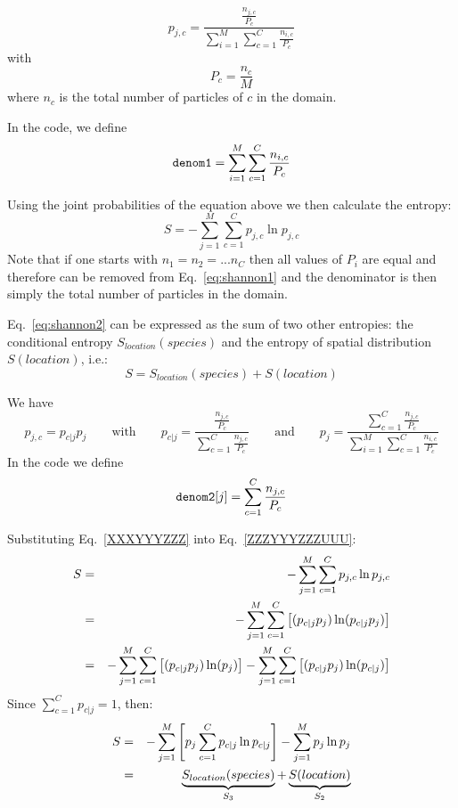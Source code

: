 \begin{equation}
p_{j,c} = \frac{\frac{n_{j,c}}{P_c}}{\sum\limits_{i=1}^M \sum\limits_{c=1}^C \frac{n_{i,c}}{P_c}}
\label{eq:shannon1}
\end{equation}
with 
\[
P_c = \frac{n_c}{M}
\]
where $n_c$ is the total number of particles of $c$ in the domain.

In the code, we define
\[
{\tt denom1}=\sum\limits_{i=1}^M \sum\limits_{c=1}^C \frac{n_{i,c}}{P_c}
\]

Using the joint probabilities of the equation above we then calculate the entropy:
\begin{equation}
S= -\sum_{j=1}^M \sum_{c=1}^C p_{j,c} \ln p_{j,c}
\label{eq:shannon2}
\end{equation}
Note that if one starts with $n_1=n_2=...n_C$ then all values of $P_i$ are equal and 
therefore can be removed from Eq.~\eqref{eq:shannon1} and the denominator is then simply 
the total number of particles in the domain.

Eq.~\eqref{eq:shannon2} can be expressed as the sum of two other entropies:
the conditional entropy $S_{location}(species)$ and the entropy of spatial 
distribution $S(location)$, i.e.:
\[
S=S_{location}(species) + S(location)
\]

We have 
\[
p_{j,c} = p_{c|j}p_j
\qquad
\text{with}
\qquad
p_{c|j}=\frac{\frac{n_{j,c}}{P_c}}{\sum\limits_{c=1}^C \frac{n_{j,c}}{P_c}}
\qquad
\text{and}
\qquad
p_j=\frac{\sum\limits_{c=1}^C \frac{n_{j,c}}{P_c}}{\sum\limits_{i=1}^M \sum\limits_{c=1}^C \frac{n_{i,c}}{P_c}} 
\]
In the code we define 
\[
{\tt denom2}[j]=\sum\limits_{c=1}^C \frac{n_{j,c}}{P_c}
\]


Substituting Eq.~\eqref{XXXYYYZZZ} into Eq.~\eqref{ZZZYYYZZZUUU}:
\begin{eqnarray}
S
&=& -\sum_{j=1}^M \sum_{c=1}^C p_{j,c} \ln p_{j,c} \nonumber\\
&=& -\sum_{j=1}^M \sum_{c=1}^C \left[ (p_{c|j}p_j) \ln (p_{c|j}p_j) \right] \nonumber\\
&=& -\sum_{j=1}^M \sum_{c=1}^C \left[ (p_{c|j}p_j) \ln (p_j) \right] 
    -\sum_{j=1}^M \sum_{c=1}^C \left[ (p_{c|j}p_j) \ln (p_{c|j}) \right] \nonumber\\
\end{eqnarray}
Since $\sum\limits_{c=1}^C p_{c|j}=1$, then:
\begin{eqnarray}
S
&=&-\sum_{j=1}^M \left[
p_j \sum_{c=1}^C p_{c|j} \ln p_{c|j}
\right]
-
\sum_{j=1}^M p_j \ln p_j \nonumber\\
&=& 
\underbrace{S_{location}(species)}_{S_3} + \underbrace{S(location)}_{S_2}
\end{eqnarray}



